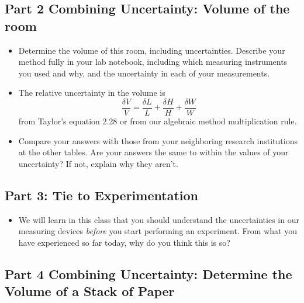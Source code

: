 \documentclass[twoside,11pt,ShortChapTitles]{BYUTextbook}
\begin{document}
\subsection{Part 2 Combining Uncertainty: Volume of the room}

\begin{itemize}
\item Determine the volume of this room, including uncertainties. Describe
your method fully in your lab notebook, including which measuring instruments
you used and why, and the uncertainty in each of your measurements.

\item The relative uncertainty in the volume is
\[
\frac{\delta V}{V}=\frac{\delta L}{L}+\frac{\delta H}{H}+\frac{\delta W}{W}
\]
from Taylor's equation 2.28 or from our algebraic method multiplication rule.

\item Compare your answers with those from your neighboring research
institutions at the other tables. Are your answers the same to within the
values of your uncertainty? If not, explain why they aren't.
\end{itemize}

\subsection{Part 3: Tie to Experimentation}

\begin{itemize}
\item We will learn in this class that you should understand the uncertainties
in our measuring devices \emph{before} you start performing an experiment.
From what you have experienced so far today, why do you think this is so?
\end{itemize}

\subsection{Part 4 Combining Uncertainty: Determine the Volume of a Stack of
Paper}
\end{document}
